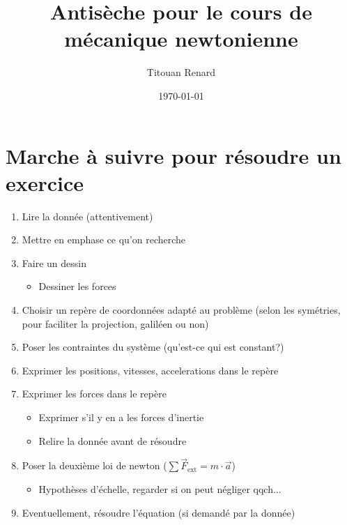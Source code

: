 \documentclass[11pt]{article}
\title{Antisèche pour le cours de mécanique newtonienne}
\date{\today}
\author{Titouan Renard}
\begin{document}
\maketitle	


\section{Marche à suivre pour résoudre un exercice}

\begin{enumerate}
    \item Lire la donnée (attentivement)
    \item Mettre en emphase ce qu'on recherche
    \item Faire un dessin
    \begin{itemize}
        \item Dessiner les forces
    \end{itemize}
    \item Choisir un repère de coordonnées adapté au problème (selon les symétries, pour faciliter la projection, galiléen ou non)
    \item Poser les contraintes du système (qu'est-ce qui est constant?)
    \item Exprimer les positions, vitesses, accelerations dans le repère
    \item Exprimer les forces dans le repère
    \begin{itemize}
        \item Exprimer s'il y en a les forces d'inertie
        \item Relire la donnée avant de résoudre
    \end{itemize}
    \item Poser la deuxième loi de newton ($\sum \vec{F}_\text{ext} = m \cdot \vec{a}$)
    \begin{itemize}
        \item Hypothèses d'échelle, regarder si on peut négliger qqch...
    \end{itemize}
    \item Eventuellement, résoudre l'équation (si demandé par la donnée)
\end{enumerate}
\end{document}
